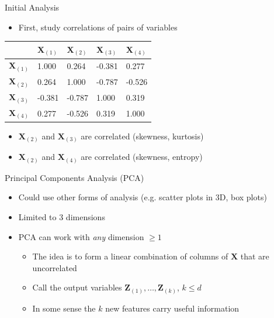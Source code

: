 \documentclass{beamer}
\begin{document}
\begin{frame}{Initial Analysis} 
\begin{itemize} 
 \item First, study correlations of pairs of variables
\end{itemize}

\begin{table}
\centering
\resizebox{\linewidth}{!} {%
\begin{tabular}{l | l l l l}
 & $\textbf{X}_{(1)}$ & $\textbf{X}_{(2)}$ & $\textbf{X}_{(3)}$ & $\textbf{X}_{(4)}$ \\ 
 \hline
$\textbf{X}_{(1)}$ & 1.000 & 0.264 & -0.381 & 0.277\\
$\textbf{X}_{(2)}$ & 0.264 & 1.000 & -0.787 & -0.526\\
$\textbf{X}_{(3)}$ & -0.381 & -0.787 & 1.000 & 0.319\\
$\textbf{X}_{(4)}$ & 0.277 & -0.526 & 0.319 & 1.000\\
\end{tabular} }
\end{table} 
\begin{itemize} 
 \item $\textbf{X}_{(2)}$ and $\textbf{X}_{(3)}$ are correlated (skewness, kurtosis)
 \item $\textbf{X}_{(2)}$ and $\textbf{X}_{(4)}$ are correlated (skewness, entropy)
\end{itemize}
\end{frame}

\begin{frame}{Principal Components Analysis (PCA)} 
\begin{itemize} 
 \item Could use other forms of analysis (e.g. scatter plots in 3D, box plots) 
 \item Limited to 3 dimensions 
 \item PCA can work with \emph{any} dimension $\geq 1$
 \begin{itemize} 
 \item The idea is to form a linear combination of columns of $\textbf{X}$ that are uncorrelated 
 \item Call the output variables $\textbf{Z}_{(1)}, \ldots, \textbf{Z}_{(k)}$, $k \leq d$
 \item In some sense the $k$ new features carry useful information 
 \end{itemize}
\end{itemize}
\end{frame}
\end{document}
